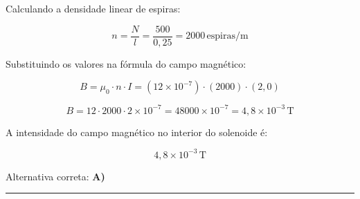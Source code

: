 \documentclass[a4paper,12pt]{article}
\begin{document}
\begin{flushleft}
Calculando \colorbox{green!20}{a densidade linear de espiras:}

\[
n = \frac{N}{l} = \frac{500}{0{,}25} = 2000\,\text{espiras/m}
\]

Substituindo os valores na fórmula do campo magnético:

\[
B = \mu_0 \cdot n \cdot I
= (12 \times 10^{-7}) \cdot (2000) \cdot (2{,}0)
\]

\[
B = 12 \cdot 2000 \cdot 2 \times 10^{-7}
= 48000 \times 10^{-7}
= 4{,}8 \times 10^{-3}\,\text{T}
\]

A intensidade do campo magnético no interior do solenoide é:

\[
\boxed{4{,}8 \times 10^{-3}\,\text{T}}
\]

Alternativa correta: \colorbox{green!50}{\textbf{A)}}

\end{flushleft}

\noindent\rule{\linewidth}{0.6pt}\\
\end{document}
